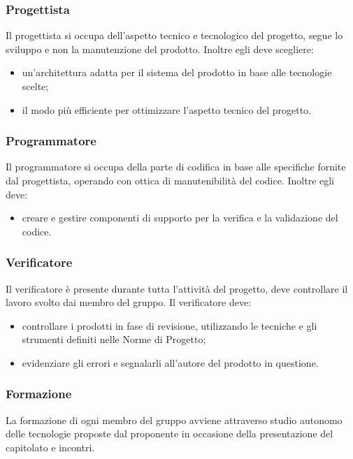 \subsubsection{Progettista}
Il progettista si occupa dell'aspetto tecnico e tecnologico del progetto, segue lo sviluppo e non la manutenzione del prodotto. Inoltre egli deve scegliere: 
\begin{itemize}
\item un'architettura adatta per il sistema del prodotto in base alle tecnologie scelte;
\item il modo più efficiente per ottimizzare l'aspetto tecnico del progetto.
\end{itemize}
\subsubsection{Programmatore}
Il programmatore si occupa della parte di codifica in base alle specifiche fornite dal progettista, operando con ottica di manutenibilità  del codice. Inoltre egli deve: 
\begin{itemize}
\item creare e gestire componenti di supporto per la verifica e la validazione del codice. 
\end{itemize}

\subsubsection{Verificatore}
Il verificatore è presente durante tutta l'attività   del progetto, deve controllare il lavoro svolto dai membro del gruppo. Il  verificatore deve: 
\begin{itemize}
\item controllare i prodotti in fase di revisione, utilizzando le tecniche e gli strumenti definiti  nelle Norme di Progetto; 
\item evidenziare gli errori e segnalarli all'autore del prodotto in questione.
\end{itemize}

\subsubsection{Formazione}
La formazione di ogni membro del gruppo avviene attraverso studio autonomo delle tecnologie proposte dal proponente in occasione della presentazione del capitolato e incontri.

